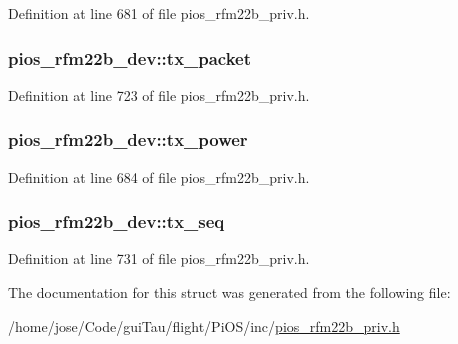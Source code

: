 Definition at line 681 of file pios\-\_\-rfm22b\-\_\-priv.\-h.

\hypertarget{structpios__rfm22b__dev_a3b7420bb896bb0b1504c4795c8af9087}{
\subsubsection[{tx\-\_\-packet}]{ pios\-\_\-rfm22b\-\_\-dev\-::tx\-\_\-packet}}\label{structpios__rfm22b__dev_a3b7420bb896bb0b1504c4795c8af9087}


Definition at line 723 of file pios\-\_\-rfm22b\-\_\-priv.\-h.

\hypertarget{structpios__rfm22b__dev_a3ca116567675ce2311161483fe4c9ff4}{
\subsubsection[{tx\-\_\-power}]{ pios\-\_\-rfm22b\-\_\-dev\-::tx\-\_\-power}}\label{structpios__rfm22b__dev_a3ca116567675ce2311161483fe4c9ff4}


Definition at line 684 of file pios\-\_\-rfm22b\-\_\-priv.\-h.

\hypertarget{structpios__rfm22b__dev_ac7ab84030bbfedd9cf397152e1d17ff9}{
\subsubsection[{tx\-\_\-seq}]{ pios\-\_\-rfm22b\-\_\-dev\-::tx\-\_\-seq}}\label{structpios__rfm22b__dev_ac7ab84030bbfedd9cf397152e1d17ff9}


Definition at line 731 of file pios\-\_\-rfm22b\-\_\-priv.\-h.



The documentation for this struct was generated from the following file\-:\begin{DoxyCompactItemize}
\item 
/home/jose/\-Code/gui\-Tau/flight/\-Pi\-O\-S/inc/\hyperlink{pios__rfm22b__priv_8h}{pios\-\_\-rfm22b\-\_\-priv.\-h}\end{DoxyCompactItemize}
